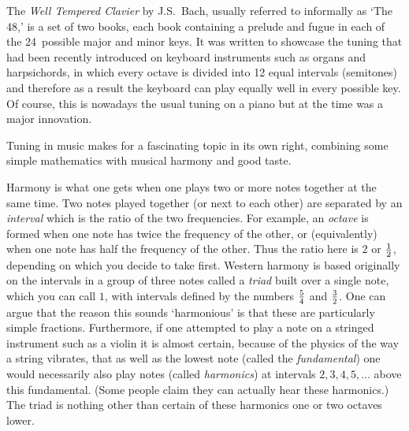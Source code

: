 

\prelude

The \textit{Well Tempered Clavier} by J.S.~Bach, usually referred to
informally as `The 48,' is a set of two books, each book containing a
prelude and fugue in each of the 24~possible major and minor keys.  It
was written to showcase the tuning that had been recently introduced
on keyboard instruments such as organs and harpsichords, in which
every octave is divided into 12 equal intervals (semitones) and
therefore as a result the keyboard can play equally well in every
possible key. Of course, this is nowadays the usual tuning on a piano
but at the time was a major innovation.

Tuning in music makes for a fascinating topic in its own right,
combining some simple mathematics with musical harmony and good taste.

Harmony is what one gets when one plays two or more notes together at
the same time.  Two notes played together (or next to each other) are
separated by an \textit{interval} which is the ratio of the two
frequencies.  For example, an \textit{octave} is formed when one note has twice
the frequency of the other, or (equivalently) when one note has
half the frequency of the other.  Thus the ratio here is $2$ or
$1 \over 2$, depending on which you decide to take first.  Western
harmony is based originally on the intervals in a group of three notes
called a \textit{triad} built over a single note, which you can call $1$, with intervals
defined by the numbers ${5\over 4}$ and ${3\over 2}$.  One can argue that
the reason this sounds `harmonious' is that these are particularly
simple fractions.  Furthermore, if one attempted to play a note on a
stringed instrument such as a violin it is almost certain, because of the physics of the
way a string vibrates, that as well as the lowest
note (called the \textit{fundamental}) one would necessarily also play notes
(called \textit{harmonics}) at intervals $2, 3, 4, 5,\ldots$ above
this fundamental.  (Some people claim they can actually hear these
harmonics.)  The triad is nothing other than certain of these harmonics
one or two octaves lower.

